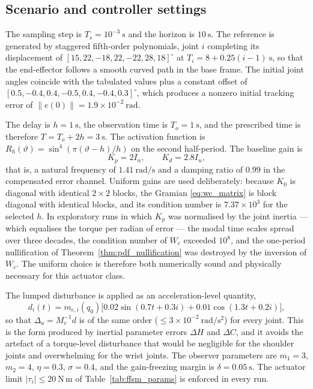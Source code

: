 \subsection{Scenario and controller settings}
The sampling step is $T_s=10^{-3}~\mathrm{s}$ and the horizon is $10~\mathrm{s}$. The reference is generated by staggered fifth-order polynomials, joint $i$ completing its displacement of $[15,22,-18,22,-22,28,18]^\circ$ at $T_i=8+0.25(i-1)~\mathrm{s}$, so that the end-effector follows a smooth curved path in the base frame. The initial joint angles coincide with the tabulated values plus a constant offset of $[0.5,-0.4,0.4,-0.5,0.4,-0.4,0.3]^\circ$, which produces a nonzero initial tracking error of $\|e(0)\|=1.9\times10^{-2}~\mathrm{rad}$.

The delay is $h=1~\mathrm{s}$, the observation time is $T_o=1~\mathrm{s}$, and the prescribed time is therefore $T=T_o+2h=3~\mathrm{s}$. The activation function is $R_h(\vartheta)=\sin^4(\pi(\vartheta-h)/h)$ on the second half-period. The baseline gain is
\begin{equation}
 K_p=2I_n,\qquad K_d=2.8I_n,
 \label{eq:sim_gains}
\end{equation}
that is, a natural frequency of $1.41~\mathrm{rad/s}$ and a damping ratio of $0.99$ in the compensated error channel. Uniform gains are used deliberately: because $K_0$ is diagonal with identical $2\times2$ blocks, the Gramian \eqref{eq:wc_matrix} is block diagonal with identical blocks, and its condition number is $7.37\times10^{3}$ for the selected $h$. In exploratory runs in which $K_p$ was normalised by the joint inertia --- which equalises the torque per radian of error --- the modal time scales spread over three decades, the condition number of $W_c$ exceeded $10^{8}$, and the one-period nullification of Theorem~\ref{thm:pdf_nullification} was destroyed by the inversion of $W_c$. The uniform choice is therefore both numerically sound and physically necessary for this actuator class.

The lumped disturbance is applied as an acceleration-level quantity,
\begin{equation}
 d_i(t)=m_{e,i}(q_0)\bigl[0.02\sin(0.7t+0.3i)+0.01\cos(1.3t+0.2i)\bigr],
 \label{eq:sim_disturbance}
\end{equation}
so that $\Delta_a=M_e^{-1}d$ is of the same order ($\le 3\times10^{-2}~\mathrm{rad/s^2}$) for every joint. This is the form produced by inertial parameter errors $\Delta H$ and $\Delta C$, and it avoids the artefact of a torque-level disturbance that would be negligible for the shoulder joints and overwhelming for the wrist joints. The observer parameters are $m_1=3$, $m_2=4$, $\eta=0.3$, $\sigma=0.4$, and the gain-freezing margin is $\delta=0.05~\mathrm{s}$. The actuator limit $|\tau_i|\le20~\mathrm{N\,m}$ of Table~\ref{tab:ffsm_params} is enforced in every run.

